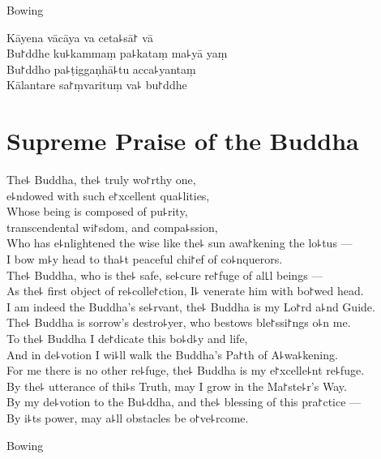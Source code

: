 \begin{instruction}
  Bowing
\end{instruction}

Kāyena vācāya va ceta꜕sā꜓ vā\\
Bu꜓ddhe ku꜕kammaṃ pa꜕kataṃ ma꜕yā yaṃ\\
Bu꜓ddho pa꜕ṭiggaṇhā꜕tu acca꜕yantaṃ\\
Kālantare sa꜓ṃvarituṃ va꜕ bu꜓ddhe

\clearpage

\chapter{Supreme Praise of the Buddha}%

\begin{leader}
\end{leader}

The꜕ Buddha, the꜕ truly wo꜓rthy one,\\
\vin e꜕ndowed with such e꜓xcellent qua꜕lities,\\
Whose being is composed of pu꜕rity,\\
\vin transcendental wi꜓sdom, and compa꜕ssion,\\
Who has e꜕nlightened the wise like the꜕ sun awa꜓kening the lo꜕tus ---\\
I bow m꜕y head to tha꜕t peaceful chi꜓ef of co꜕nquerors.\\
The꜕ Buddha, who is the꜕ safe, se꜕cure re꜓fuge of al꜖l beings ---\\
As the꜕ first object of re꜕colle꜓ction, I꜕ venerate him with bo꜓wed head.\\
I am indeed the Buddha's se꜕rvant, the꜕ Buddha is my Lo꜓rd a꜕nd Guide.\\
The꜕ Buddha is sorrow's destro꜕yer, who bestows ble꜓ssi꜓ngs o꜕n me.\\
To the꜕ Buddha I de꜓dicate this bo꜕d꜕y and life,\\
And in de꜕votion I wi꜕ll walk the Buddha's Pa꜓th of A꜕wa꜕kening.\\
For me there is no other re꜕fuge, the꜕ Buddha is my e꜓xcelle꜕nt re꜕fuge.\\
By the꜕ utterance of thi꜕s Truth, may I grow in the Ma꜓ste꜕r's Way.\\
By my de꜕votion to the Bu꜕ddha, and the꜕ blessing of this pra꜓ctice ---\\
By i꜕ts power, may a꜕ll obstacles be o꜓ve꜕rcome.

\begin{instruction}
  Bowing
\end{instruction}

